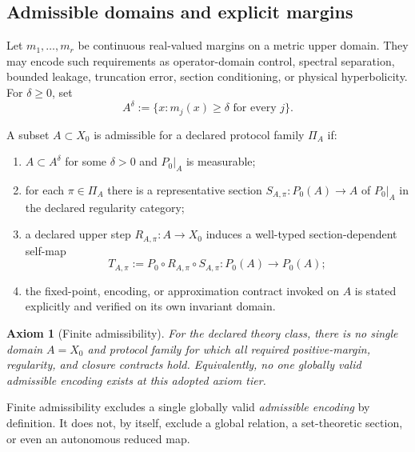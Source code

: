 \documentclass[11pt]{article}
\theoremstyle{plain}
\newtheorem{axiom}{Axiom}[section]
\theoremstyle{plain}
\begin{document}
\subsection{Admissible domains and explicit margins}

\begin{definition}
Let $m_1,\ldots,m_r$ be continuous real-valued margins on a metric upper
domain.  They may encode such requirements as operator-domain control,
spectral separation, bounded leakage, truncation error, section conditioning,
or physical hyperbolicity.  For $\delta\ge0$, set
\[
A^\delta:=\{x:m_j(x)\ge\delta\text{ for every }j\}.
\]
\end{definition}

\begin{definition}
A subset $A\subset X_0$ is admissible for a declared protocol family
$\Pi_A$ if:
\begin{enumerate}
\item $A\subset A^\delta$ for some $\delta>0$ and $P_0|_A$ is measurable;
\item for each $\pi\in\Pi_A$ there is a representative section
$S_{A,\pi}:P_0(A)\to A$ of $P_0|_A$ in the declared regularity category;
\item a declared upper step $R_{A,\pi}:A\to X_0$ induces a well-typed
section-dependent self-map
\[
T_{A,\pi}:=P_0\circ R_{A,\pi}\circ S_{A,\pi}
   :P_0(A)\longrightarrow P_0(A);
\]
\item the fixed-point, encoding, or approximation contract invoked on $A$
is stated explicitly and verified on its own invariant domain.
\end{enumerate}
\end{definition}

\begin{axiom}[Finite admissibility]
For the declared theory class, there is no single domain $A=X_0$ and
protocol family for which all required positive-margin, regularity, and
closure contracts hold.  Equivalently, no one globally valid admissible
encoding exists at this adopted axiom tier.
\end{axiom}

\begin{remark}
Finite admissibility excludes a single globally valid \emph{admissible
encoding} by definition.  It does not, by itself, exclude a global relation,
a set-theoretic section, or even an autonomous reduced map.
\end{remark}
\end{document}
